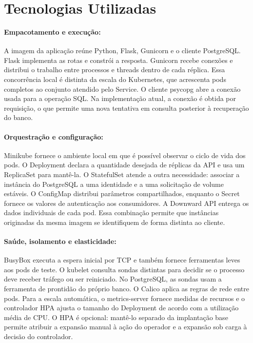 \FloatBarrier\section{Tecnologias Utilizadas}
\paragraph{Empacotamento e execução:} A imagem da aplicação reúne Python, Flask, Gunicorn e o cliente PostgreSQL. Flask implementa as rotas e constrói a resposta. Gunicorn recebe conexões e distribui o trabalho entre processos e threads dentro de cada réplica. Essa concorrência local é distinta da escala do Kubernetes, que acrescenta pods completos ao conjunto atendido pelo Service. O cliente psycopg abre a conexão usada para a operação SQL. Na implementação atual, a conexão é obtida por requisição, o que permite uma nova tentativa em consulta posterior à recuperação do banco.

\paragraph{Orquestração e configuração:} Minikube fornece o ambiente local em que é possível observar o ciclo de vida dos pods. O Deployment declara a quantidade desejada de réplicas da API e usa um ReplicaSet para mantê-la. O StatefulSet atende a outra necessidade: associar a instância do PostgreSQL a uma identidade e a uma solicitação de volume estáveis. O ConfigMap distribui parâmetros compartilhados, enquanto o Secret fornece os valores de autenticação aos consumidores. A Downward API entrega os dados individuais de cada pod. Essa combinação permite que instâncias originadas da mesma imagem se identifiquem de forma distinta ao cliente.

\paragraph{Saúde, isolamento e elasticidade:} BusyBox executa a espera inicial por TCP e também fornece ferramentas leves aos pods de teste. O kubelet consulta sondas distintas para decidir se o processo deve receber tráfego ou ser reiniciado. No PostgreSQL, as sondas usam a ferramenta de prontidão do próprio banco. O Calico aplica as regras de rede entre pods. Para a escala automática, o metrics-server fornece medidas de recursos e o controlador HPA ajusta o tamanho do Deployment de acordo com a utilização média de CPU. O HPA é opcional: mantê-lo separado da implantação base permite atribuir a expansão manual à ação do operador e a expansão sob carga à decisão do controlador.
